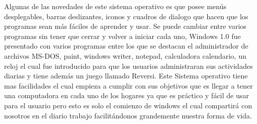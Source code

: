 Algunas de las novedades de este sistema operativo es que posee menús desplegables, barras deslizantes, iconos y cuadros de dialogo que hacen que los programas sean más 
fáciles de aprender y usar. Se puede cambiar entre varios programas sin tener que cerrar y volver a iniciar cada uno, Windows 1.0 fue presentado con varios programas entre 
los que se destacan el administrador de archivos MS-DOS, paint, windows writer, notepad, calculadora calendario, un reloj el cual fue introducido para que los usuarios 
administraran sus actividades diarias y tiene además un juego  llamado Reversi. Este Sistema operativo tiene mas facilidades el cual empieza a cumplir con sus objetivos que 
es llegar a tener una computadora en cada uno de los hogares ya que es práctico y fácil de usar para el usuario pero esto es solo el comienzo de windows el cual compartirá 
con nosotros en el diario trabajo facilitándonos grandemente nuestra forma de vida.




